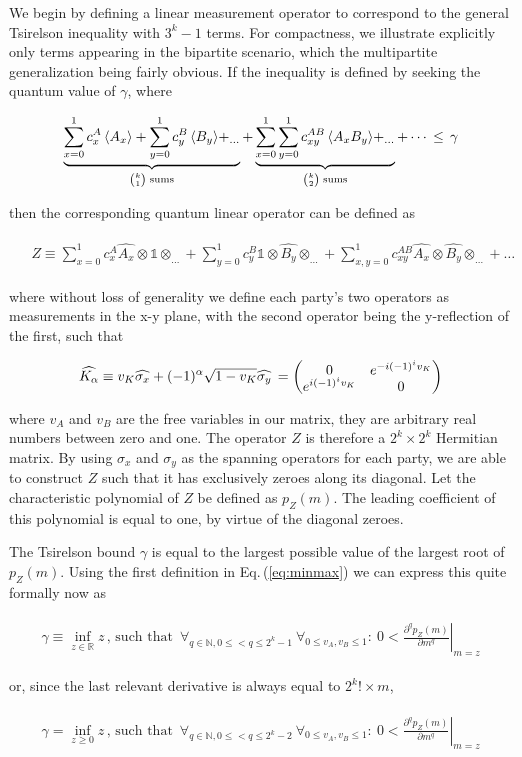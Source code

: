 \documentclass[
  12pt          %
  ,letterpaper  %
  ,center       %
  ,noupper      %
  ,english,fleqn]{uconnthesis}
\newcommand {\id}[0]{\ensuremath{\mathds{1}}}
\newcommand{\LeftEqns}[1]{\begin{fleqn}[\leftmargini minus \leftmargini]\begin{align}#1\end{align}\end{fleqn}}
\newcommand{\LeftEqn}[1]{\LeftEqns{\begin{split}#1\end{split}}}
\newcommand{\ceq}[1]{Eq.\,(\ref{#1})}
\begin{document}
We begin by defining a linear measurement operator to correspond to the general Tsirelson inequality with $3^k-1$ terms. For compactness, we illustrate explicitly only terms appearing in the bipartite scenario, which the multipartite generalization being fairly obvious. If the inequality is defined by seeking the quantum value of $\gamma$, where
\LeftEqn{\label{eq:simple}\underbrace{\sum\limits_{x=0}^{1}{c^A_x\Braket{A_x}}+\sum\limits_{y=0}^{1}{c^B_y\Braket{B_y}}+_{...}}_{\binom{k}{1} \text{ sums}}+\underbrace{\sum\limits_{x=0}^{1}{\sum\limits_{y=0}^{1}{c^{AB}_{xy}\Braket{A_x B_y}}}+_{...}}_{\binom{k}{2} \text{ sums}}+\cdots \,\leq\,\gamma
}
then the corresponding quantum linear operator can be defined as 
\LeftEqn{\label{eq:expec}
&Z  \equiv \sum\limits_{x=0}^{1}{c^A_x \widehat{A_x}\otimes \id\otimes_{...}}+\sum\limits_{y=0}^{1}{c^B_y \id\otimes\widehat{B_y}\otimes_{...}}+\sum\limits_{x,y=0}^{1}{{c^{AB}_{xy}\widehat{A_x}\otimes \widehat{B_y}\otimes_{...}}}+\dots
}
where without loss of generality we define each party's two operators as measurements in the x-y plane, with the second operator being the y-reflection of the first, such that
\LeftEqn{\label{eq:setup}
\renewcommand*{\arraystretch}{0.5}
\widehat{K_\alpha} \equiv v_K \widehat{\sigma_x}+(-1)^\alpha \sqrt{1-v_K} \widehat{\sigma_y} \,= \begin{pmatrix}
 0 & e^{-i (-1)^i v_K} \\
 e^{i (-1)^i v_K} & 0 
\end{pmatrix}
}
where $v_A$ and $v_B$ are the free variables in our matrix, they are arbitrary real numbers between zero and one. The operator $Z$ is therefore a $2^k\times 2^k$ Hermitian matrix. By using $\sigma_x$ and $\sigma_y$ as the spanning operators for each party, we are able to construct $Z$ such that it has exclusively zeroes along its diagonal. Let the characteristic polynomial of $Z$ be defined as $p_Z(m)$. The leading coefficient of this polynomial is equal to one, by virtue of the diagonal zeroes. 

The Tsirelson bound $\gamma$ is equal to the largest possible value of the largest root of $p_Z(m)$. Using the first definition in \ceq{eq:minmax} we can express this quite formally now as
\LeftEqn{\label{eq:gammasol}
\gamma \equiv \inf_{z\in \mathbb{R}}z\, \text{, such that }\, \forall_{q\in \mathbb{N},0\leq<q\leq 2^k-1}\: \forall_{0\leq v_A,v_B \leq 1}:\: 0< {\left. \frac{\partial^q p_Z(m)}{\partial m^q} \right\rvert}_{m=z}
}
or, since the last relevant derivative is always equal to $2^k! \times m$,
\LeftEqn{\label{eq:gammasol2}
\gamma = \inf_{z\geq 0}z\, \text{, such that }\, \forall_{q\in \mathbb{N},0\leq<q\leq 2^k-2}\: \forall_{0\leq v_A,v_B \leq 1}:\: 0< {\left. \frac{\partial^q p_Z(m)}{\partial m^q} \right\rvert}_{m=z}
}
\end{document}
